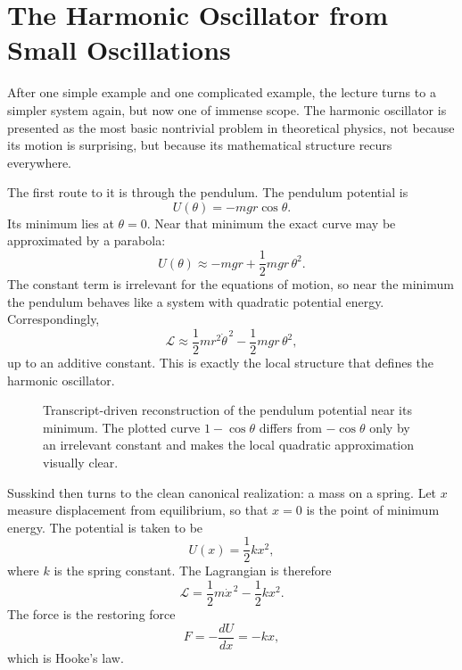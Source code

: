 \section{The Harmonic Oscillator from Small Oscillations}

After one simple example and one complicated example, the lecture turns to a simpler system again, but now one of immense scope. The harmonic oscillator is presented as the most basic nontrivial problem in theoretical physics, not because its motion is surprising, but because its mathematical structure recurs everywhere.

The first route to it is through the pendulum. The pendulum potential is
\begin{equation}
U(\theta)=-mgr\cos\theta.
\end{equation}
Its minimum lies at \(\theta=0\). Near that minimum the exact curve may be approximated by a parabola:
\begin{equation}
U(\theta)\approx -mgr+\frac12 mgr\,\theta^2.
\end{equation}
The constant term is irrelevant for the equations of motion, so near the minimum the pendulum behaves like a system with quadratic potential energy. Correspondingly,
\begin{equation}
\mathcal{L}
\approx
\frac12 mr^2\dot\theta^{\,2}
-
\frac12 mgr\,\theta^2,
\end{equation}
up to an additive constant. This is exactly the local structure that defines the harmonic oscillator.

\begin{figure}[h]
\centering
{}
\caption{Transcript-driven reconstruction of the pendulum potential near its minimum. The plotted curve \(1-\cos\theta\) differs from \(-\cos\theta\) only by an irrelevant constant and makes the local quadratic approximation visually clear.}
\end{figure}

Susskind then turns to the clean canonical realization: a mass on a spring. Let \(x\) measure displacement from equilibrium, so that \(x=0\) is the point of minimum energy. The potential is taken to be
\begin{equation}
U(x)=\frac12 kx^2,
\end{equation}
where \(k\) is the spring constant. The Lagrangian is therefore
\begin{equation}
\mathcal{L}=\frac12 m\dot x^{\,2}-\frac12 kx^2.
\end{equation}
The force is the restoring force
\begin{equation}
F=-\frac{dU}{dx}=-kx,
\end{equation}
which is Hooke's law.

